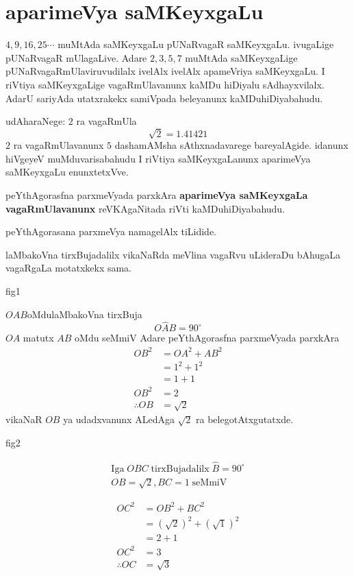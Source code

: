 \chapter{aparimeVya saMKeyxgaLu}

$ 4,9,16,25\cdots$ muMtAda saMKeyxgaLu pUNaRvagaR saMKeyxgaLu. ivugaLige pUNaRvagaR mUlagaLive. Adare 
$2,3,5,7$ muMtAda saMKeyxgaLige pUNaRvagaRmUlaviruvudilalx ivelAlx ivelAlx apameVriya saMKeyxgaLu. I 
riVtiya saMKeyxgaLige vagaRmUlavanunx kaMDu hiDiyalu sAdhayxvilalx. AdarU sariyAda utatxrakekx 
samiVpada beleyanunx kaMDuhiDiyabahudu.

udAharaNege: \qquad $2$ ra vagaRmUla
$$
\sqrt{2} = 1.41421
$$
$2$ ra vagaRmUlavanunx $5$ dashamAMsha sAthxnadavarege bareyalAgide. idanunx hiVgeyeV muMduvarisabahudu I riVtiya saMKeyxgaLanunx aparimeVya saMKeyxgaLu enunxtetxVve.

peYthAgorasfna parxmeVyada parxkAra {\bf aparimeVya saMKeyxgaLa vagaRmUlavanunx} \-reVKAgaNitada riVti kaMDuhiDiyabahudu.

peYthAgorasana parxmeVya namagelAlx tiLidide. 

laMbakoVna tirxBujadalilx vikaNaRda meVlina vagaRvu uLideraDu bAhugaLa vagaRgaLa motatxkekx sama.

\begin{center}
{\rm fig1}
\end{center}
$OAB$\quad oMdulaMbakoVna tirxBuja
$$
O\widehat{A}B = 90^{\circ}
$$
$OA$ matutx $AB$ oMdu seMmiV Adare peYthAgorasfna parxmeVyada parxkAra
\begin{align*}
OB^2 &= OA^2+AB^2\\
&= 1^2+1^2\\
&= 1+1\\
OB^2 &= 2\\
\therefore OB &= \sqrt{2}
\end{align*}
vikaNaR $OB$ ya udadxvanunx ALedAga $\sqrt{2}$ ra belegotAtxgutatxde.
\begin{center}
{\rm fig2}
\end{center}

\begin{gather*}
\text{Iga}\;  OBC \;\text{tirxBujadalilx}\;  \widehat{B} = 90^{\circ}\\
OB=\sqrt{2}, BC = 1 \;\text{seMmiV}
\end{gather*}

\begin{align*}
OC^2 &= OB^2+BC^2\\
&= (\sqrt{2})^2+(\sqrt{1})^2\\
&=2+1\\
OC^2&= 3\\
\therefore OC &= \sqrt{3}
\end{align*}

